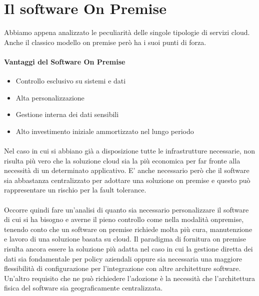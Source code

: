 \section{Il software On Premise}
Abbiamo appena analizzato le peculiarità delle singole tipologie di servizi cloud. Anche il classico modello on premise però ha i suoi punti di forza.
\paragraph{Vantaggi del Software On Premise}
\begin{itemize}
	\item Controllo esclusivo su sistemi e dati
	\item Alta personalizzazione
	\item Gestione interna dei dati sensibili
	\item Alto investimento iniziale ammortizzato nel lungo periodo
\end{itemize}

\paragraph{}
Nel caso in cui si abbiano già a disposizione tutte le infrastrutture necessarie, non risulta più vero che la soluzione cloud sia la più economica per far fronte alla necessità di un determinato applicativo. E' anche necessario però che il software sia abbastanza centralizzato per adottare una soluzione on premise e questo può rappresentare un rischio per la fault tolerance.

\paragraph{}
Occorre quindi fare un'analisi di quanto sia necessario personalizzare il software di cui si ha bisogno e averne il pieno controllo come nella modalità onpremise, tenendo conto che un software on premise richiede molta più cura, manutenzione e lavoro di una soluzione basata su cloud. Il paradigma di fornitura on premise risulta ancora essere la soluzione più adatta nel caso in cui la gestione diretta dei dati sia fondamentale per policy aziendali oppure sia necessaria una maggiore flessibilità di configurazione per l'integrazione con altre architetture software. Un'altro requisito che ne può richiedere l'adozione è la necessità che l'architettura fisica del software sia geograficamente centralizzata.
